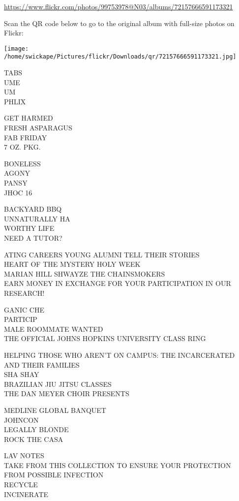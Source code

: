 \documentclass[10pt,letterpaper]{article}
\begin{document}
\url{https://www.flickr.com/photos/99753978@N03/albums/72157666591173321}

Scan the QR code below to go to the original album with full-size photos on Flickr:

\texttt{[image: /home/swickape/Pictures/flickr/Downloads/qr/72157666591173321.jpg]}


TABS\\
UME\\
UM\\
PHLIX

GET HARMED\\
FRESH ASPARAGUS\\
FAB FRIDAY\\
7 OZ. PKG.

BONELESS\\
AGONY\\
PANSY\\
JHOC 16

BACKYARD BBQ\\
UNNATURALLY HA\\
WORTHY LIFE\\
NEED A TUTOR?

ATING CAREERS YOUNG ALUMNI TELL THEIR STORIES\\
HEART OF THE MYSTERY HOLY WEEK\\
MARIAN HILL SHWAYZE THE CHAINSMOKERS\\
EARN MONEY IN EXCHANGE FOR YOUR PARTICIPATION IN OUR RESEARCH!

GANIC CHE\\
PARTICIP\\
MALE ROOMMATE WANTED\\
THE OFFICIAL JOHNS HOPKINS UNIVERSITY CLASS RING

HELPING THOSE WHO AREN'T ON CAMPUS: THE INCARCERATED AND THEIR FAMILIES\\
SHA SHAY\\
BRAZILIAN JIU JITSU CLASSES\\
THE DAN MEYER CHOIR PRESENTS

MEDLINE GLOBAL BANQUET\\
JOHNCON\\
LEGALLY BLONDE\\
ROCK THE CASA

LAV NOTES\\
TAKE FROM THIS COLLECTION TO ENSURE YOUR PROTECTION FROM POSSIBLE INFECTION\\
RECYCLE\\
INCINERATE
\end{document}
